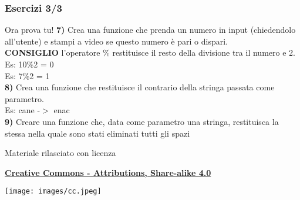 \documentclass{beamer}
\begin{document}
\begin{frame}[fragile]
\frametitle{Esercizi 3/3}
\begin{block}{Ora prova tu!}
	\textbf{7)}  Crea una funzione che prenda un numero in input (chiedendolo all'utente) e stampi a video se questo numero è pari o dispari.\\
	\textbf{CONSIGLIO} l'operatore \% restituisce il resto della divisione tra il numero e 2.\\
	Es: 10\%2 = 0\\
	Es: 7\%2 = 1\\
	\textbf{8)} Crea una funzione che restituisce il contrario della stringa passata come parametro.\\
	Es: cane -$>$ enac\\
	\textbf{9)} Creare una funzione che, data come parametro una stringa, restituisca la stessa nella quale sono stati eliminati tutti gli spazi\\
\end{block}
\end{frame}


\begin{frame}

\begin{center}
	\bigskip
	Materiale rilasciato con licenza
	
	\textbf{\href{http://creativecommons.org/licenses/by-sa/4.0/}{Creative Commons - Attributions, Share-alike 4.0}}
	
	\medskip
	\texttt{[image: images/cc.jpeg]}
\end{center}

\end{frame}
	
\end{document}
